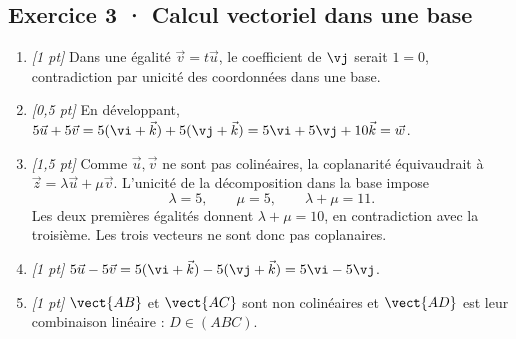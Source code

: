 \subsection*{Exercice 3 · Calcul vectoriel dans une base}\begin{enumerate}

\item \textit{[1 pt]} Dans une égalité $\vec v=t\vec u$, le coefficient de $\vj $ serait $1=0$, contradiction par unicité des coordonnées dans une base.

\item \textit{[0,5 pt]} En développant, $5\vec u+5\vec v=5(\vi +\vec k)+5(\vj +\vec k)=5\vi +5\vj +10\vec k=\vec w$.

\item \textit{[1,5 pt]} Comme $\vec u,\vec v$ ne sont pas colinéaires, la coplanarité équivaudrait à $\vec z=\lambda\vec u+\mu\vec v$. L'unicité de la décomposition dans la base impose
\[\lambda=5,\qquad\mu=5,\qquad\lambda+\mu=11.\]
Les deux premières égalités donnent $\lambda+\mu=10$, en contradiction avec la troisième. Les trois vecteurs ne sont donc pas coplanaires.

\item \textit{[1 pt]} $5\vec u-5\vec v=5(\vi +\vec k)-5(\vj +\vec k)=5\vi -5\vj $.

\item \textit{[1 pt]} $\vect{AB}$ et $\vect{AC}$ sont non colinéaires et $\vect{AD}$ est leur combinaison linéaire : $D\in(ABC)$.

\end{enumerate}


